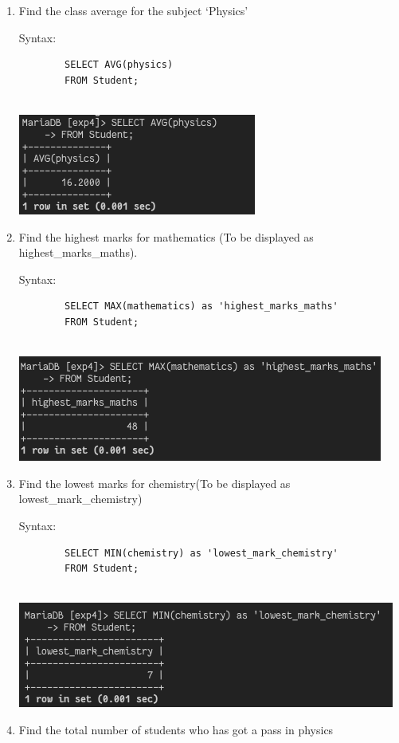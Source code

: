 \documentclass[13pt,oneside]{book}
\begin{document}
\begin{enumerate}
		
		\item
		Find the class average for the subject ‘Physics’ 
		 
		Syntax:
		\begin{verbatim}
		SELECT AVG(physics)
		FROM Student;
		
		\end{verbatim}
		\includegraphics[]{img/p4/ss2.png}
		
		
		\item
		Find the highest marks for mathematics (To be displayed as highest\_marks\_maths). 
		 
		Syntax:
		\begin{verbatim}
		SELECT MAX(mathematics) as 'highest_marks_maths'
		FROM Student;
		
		\end{verbatim}
		\includegraphics[]{img/p4/ss3.png}
		
		
		\item
		Find the lowest marks for chemistry(To be displayed as lowest\_mark\_chemistry) 
		 
		Syntax:
		\begin{verbatim}
		SELECT MIN(chemistry) as 'lowest_mark_chemistry'
		FROM Student;
		
		\end{verbatim}
		\includegraphics[]{img/p4/ss4.png}
		
		
		\item
		Find the total number of students who has got a pass in physics
		 

\end{enumerate}
\end{document}
